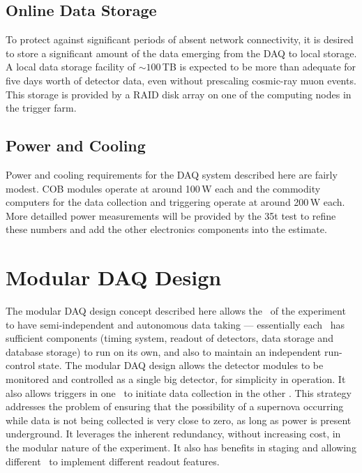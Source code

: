 \subsection{Online Data Storage}

To protect against significant periods of absent network connectivity,
it is desired to store a significant amount of the data emerging from
the DAQ to local storage.  A local data storage facility of $\sim
100\,$TB is expected to be more than adequate for five days worth of
detector data, even without prescaling cosmic-ray muon events.  This
storage is provided by a RAID disk array on one of the computing nodes
in the trigger farm.

\subsection{Power and Cooling}

Power and cooling requirements for the DAQ system described here are
fairly modest.  COB modules operate at around 100\,W each and the
commodity computers for the data collection and triggering operate at around
200\,W each.  More detailled power measurements will be provided by the
35t test to refine these numbers and add the other electronics
components into the estimate.


\section{Modular DAQ Design}
\label{sec:daq_upper}

The modular DAQ design concept described here allows the
\COMPARTMENTS\ of the experiment to have semi-independent and
autonomous data taking --- essentially each \COMPARTMENT\ has sufficient
components (timing system, readout of detectors, data storage and
database storage) to run on its own, %
and also to maintain an independent
run-control state.  The modular DAQ design allows the %
detector modules to
be monitored and controlled as a single big detector, for simplicity
in operation.  It also allows triggers in one \COMPARTMENT\ to initiate
data collection in the other \COMPARTMENTS.
This strategy addresses the problem of ensuring that the possibility
of a supernova occurring while data is not being collected is very
close to zero, as long as power is present
underground.  It leverages the inherent redundancy, without
increasing cost, in the modular nature of the experiment.
It also has benefits in staging and allowing different \COMPARTMENTS\ 
to implement different readout features.

